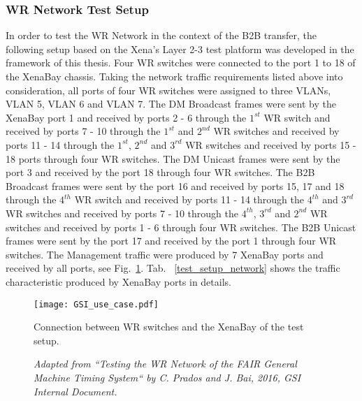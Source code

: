 \subsubsection{WR Network Test Setup}
In order to test the WR Network in the context of the B2B transfer, the following setup based on the Xena's Layer 2-3 test platform was developed in the framework of this thesis. Four WR switches were connected to the port 1 to 18 of the XenaBay chassis. Taking the network traffic requirements listed above into consideration, all ports of four WR switches were assigned to three VLANs, VLAN 5, VLAN 6 and VLAN 7. The DM Broadcast frames were sent by the XenaBay port 1 and received by ports 2 - 6 through the $1^{st}$ WR switch and received by ports 7 - 10 through the $1^{st}$ and $2^{nd}$ WR switches and received by ports 11 - 14 through the $1^{st}$, $2^{nd}$ and $3^{rd}$ WR switches and received by ports 15 - 18 ports through four WR switches. The DM Unicast frames were sent by the port 3 and received by the port 18 through four WR switches. The B2B Broadcast frames were sent by the port 16 and received by ports 15, 17 and 18 through the $4^{th}$ WR switch and received by ports 11 - 14 through the $4^{th}$ and $3^{rd}$ WR switches and received by ports 7 - 10 through the $4^{th}$, $3^{rd}$ and $2^{nd}$ WR switches and received by ports 1 - 6 through four WR switches. The B2B Unicast frames were sent by the port 17 and received by the port 1 through four WR switches. The Management traffic were produced by 7 XenaBay ports and received by all ports, see Fig.~\ref{GSI_use_case.jpg}.  Tab. ~\ref{test_setup_network} shows the traffic characteristic produced by XenaBay ports in details. 
\begin{figure}[H]
   \centering   
   \texttt{[image: GSI\_use\_case.pdf]}
   \caption{Connection between WR switches and the XenaBay of the test setup.}
    \caption*{\textsl{\small{Adapted from ``Testing the WR Network of the FAIR General Machine Timing System`` by C. Prados and J. Bai, 2016, GSI Internal Document.}}}
   \label{GSI_use_case.jpg}
\end{figure}



